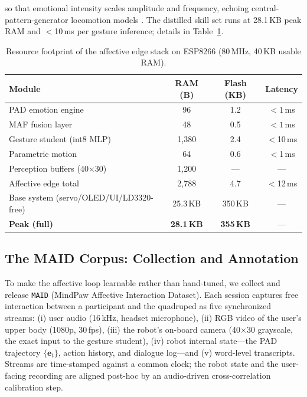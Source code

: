 \documentclass{article}
\theoremstyle{definition}
\begin{document}
so that emotional intensity scales amplitude and frequency, echoing
central-pattern-generator locomotion models \cite{ijspeert2008cpg}. The
distilled skill set runs at 28.1\,KB peak RAM
and $<$10\,ms per gesture inference; details in Table~\ref{tab:resource}.

\begin{table}[t]
\centering
\small
\begin{tabular}{lccc}
\toprule
\textbf{Module} & \textbf{RAM (B)} & \textbf{Flash (KB)} & \textbf{Latency} \\
\midrule
PAD emotion engine         & 96    & 1.2   & $<1$\,ms \\
MAF fusion layer           & 48    & 0.5   & $<1$\,ms \\
Gesture student (int8 MLP) & 1,380 & 2.4   & $<$10\,ms \\
Parametric motion          & 64    & 0.6   & $<$1\,ms \\
Perception buffers (40$\times$30) & 1,200 & --- & --- \\
\midrule
Affective edge total       & 2,788 & 4.7   & $<$12\,ms \\
\midrule
Base system (servo/OLED/UI/LD3320-free) & 25.3\,KB & 350\,KB & --- \\
\textbf{Peak (full)}       & \textbf{28.1\,KB} & \textbf{355\,KB} & --- \\
\bottomrule
\end{tabular}
\caption{Resource footprint of the affective edge stack on ESP8266
(80\,MHz, 40\,KB usable RAM).}
\label{tab:resource}
\end{table}

\subsection{The MAID Corpus: Collection and Annotation}

To make the affective loop learnable rather than hand-tuned, we collect and
release \texttt{MAID} (MindPaw Affective Interaction Dataset). Each session
captures free interaction between a participant and the quadruped as five
synchronized streams: (i) user audio (16\,kHz, headset microphone), (ii) RGB
video of the user's upper body (1080p, 30\,fps), (iii) the robot's on-board
camera (40$\times$30 grayscale, the exact input to the gesture student),
(iv) robot internal state---the PAD trajectory $\{\mathbf{e}_t\}$, action
history, and dialogue log---and (v) word-level transcripts. Streams are
time-stamped against a common clock; the robot state and the user-facing
recording are aligned post-hoc by an audio-driven cross-correlation
calibration step.
\end{document}
